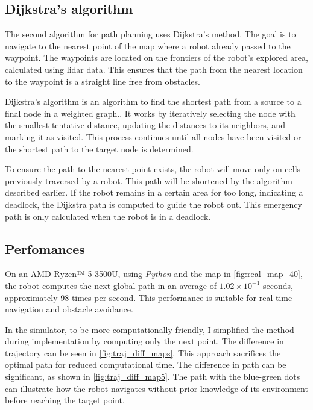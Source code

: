 \documentclass[../main.tex]{subfiles}
\begin{document}
\subsection{Dijkstra's algorithm}

The second algorithm for path planning uses Dijkstra's method. The goal is to navigate to the nearest point of the map where a robot already passed to the waypoint. The waypoints are located on the frontiers of the robot's explored area, calculated using lidar data. This ensures that the path from the nearest location to the waypoint is a straight line free from obstacles. 

\vspace{1em}

Dijkstra's algorithm is an algorithm to find the shortest path from a source to a final node in a weighted graph.\cite{dijkstra_1959}. It works by iteratively selecting the node with the smallest tentative distance, updating the distances to its neighbors, and marking it as visited. This process continues until all nodes have been visited or the shortest path to the target node is determined.\cite{dijkstra_anim_wiki_2025}

\vspace{1em}

To ensure the path to the nearest point exists, the robot will move only on cells previously traversed by a robot. This path will be shortened by the algorithm described earlier.
If the robot remains in a certain area for too long, indicating a deadlock, the Dijkstra path is computed to guide the robot out. This emergency path is only calculated when the robot is in a deadlock.

\subsection{Perfomances}

On an AMD Ryzen™ 5 3500U, using \textit{Python} and the map in \autoref{fig:real_map_40}, the robot computes the next global path in an average of $1.02 \times 10^{-1}$ seconds, approximately 98 times per second. This performance is suitable for real-time navigation and obstacle avoidance.

\vspace{1em}

In the simulator, to be more computationally friendly, I simplified the method during implementation by computing only the next point. The difference in trajectory can be seen in \autoref{fig:traj_diff_maps}. This approach sacrifices the optimal path for reduced computational time. The difference in path can be significant, as shown in \autoref{fig:traj_diff_map5}. The path with the blue-green dots can illustrate how the robot navigates without prior knowledge of its environment before reaching the target point.
\end{document}
